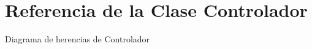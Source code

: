 \hypertarget{classControlador}{}\section{Referencia de la Clase Controlador}
\label{classControlador}


Diagrama de herencias de Controlador
